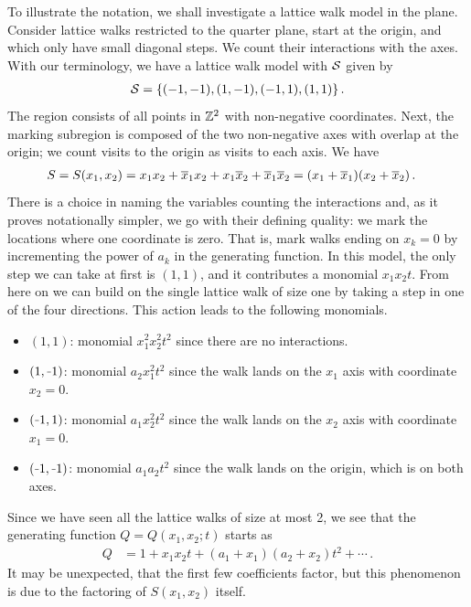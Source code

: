 \begin{exa} To illustrate the notation, we shall investigate a lattice walk model in the plane. Consider lattice walks restricted to the quarter plane, start at the origin, and which only have small diagonal steps. We count their interactions with the axes. With our terminology, we have a lattice walk model with $\mathcal{S}$ given by
\begin{align}
	\mathcal{S} = \{(-1,-1),(1,-1),(-1,1),(1,1)\}\,.
\end{align}
The region consists of all points in $\mathbb{Z}^2$ with non-negative coordinates. Next, the marking subregion is composed of the two non-negative axes with overlap at the origin; we count visits to the origin as visits to each axis. We have
\begin{align}
	S &= S(x_1,x_2)  = x_1x_2 + \overline{x}_1x_2 + x_1\overline{x}_2 + \overline{x}_1 \overline{x}_2 = (x_1 + \overline{x}_1)(x_2 + \overline{x}_2)\,.
\end{align}
There is a choice in naming the variables counting the interactions and, as it proves notationally simpler, we go with their defining quality: we mark the locations where one coordinate is zero. That is, mark walks ending on $x_k = 0$ by incrementing the power of $a_k$ in the generating function. In this model, the only step we can take at first is $(1,1)$, and it contributes a monomial $x_1x_2t$. From here on we can build on the single lattice walk of size one by taking a step in one of the four directions. This action leads to the following monomials.
\begin{itemize}
	\item $(1,1)$: monomial $x_1^2x_2^2 t^2$ since there are no interactions.
	\item $(1,\um1)$: monomial  $a_2x_1^2t^2$ since the walk lands on the $x_1$ axis with coordinate $x_2 = 0$.
	\item $(\um 1,1)$: monomial  $a_1x_2^2 t^2$ since the walk lands on the $x_2$ axis with coordinate $x_1 = 0$.
	\item $(\um1,\um1)$: monomial  $a_1a_2 t^2$ since the walk lands on the origin, which is on both axes.
\end{itemize}
Since we have seen all the lattice walks of size at most 2, we see that the generating function $Q = Q(x_1,x_2;t)$ starts as
\begin{align}
	Q  &= 1 + x_1x_2 t + (a_1 + x_1)(a_2 + x_2)t^2 + \cdots\,.
\end{align}
It may be unexpected, that the first few coefficients factor, but this phenomenon is due to the factoring of $S(x_1,x_2)$ itself.
\end{exa}